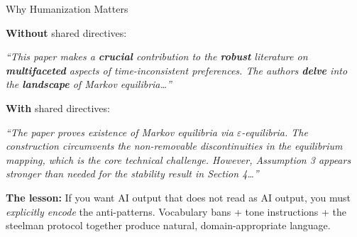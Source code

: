 \documentclass[10pt,english,aspectratio=169]{beamer}
\begin{document}
\begin{frame}{Why Humanization Matters}

\textbf{Without} shared directives:

\vspace{0.1cm}
\begin{tcolorbox}[colback=red!3, colframe=red!40, fonttitle=\bfseries\footnotesize, title=AI-sounding review]
{\footnotesize\itshape ``This paper makes a \textbf{crucial} contribution to the \textbf{robust} literature on \textbf{multifaceted} aspects of time-inconsistent preferences. The authors \textbf{delve} into the \textbf{landscape} of Markov equilibria\ldots''}
\end{tcolorbox}

\vspace{0.2cm}
\textbf{With} shared directives:

\vspace{0.1cm}
\begin{tcolorbox}[colback=green!3, colframe=green!40, fonttitle=\bfseries\footnotesize, title=Human-sounding review]
{\footnotesize\itshape ``The paper proves existence of Markov equilibria via $\varepsilon$-equilibria. The construction circumvents the non-removable discontinuities in the equilibrium mapping, which is the core technical challenge. However, Assumption 3 appears stronger than needed for the stability result in Section 4\ldots''}
\end{tcolorbox}

\vspace{0.3cm}
\textbf{The lesson:} If you want AI output that does not read as AI output, you must \emph{explicitly encode} the anti-patterns. Vocabulary bans + tone instructions + the steelman protocol together produce natural, domain-appropriate language.

\end{frame}
\end{document}
